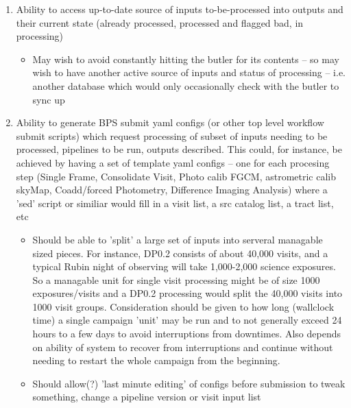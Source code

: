\documentclass[DM,authoryear,toc]{lsstdoc}
\begin{document}
	\begin{enumerate}

	\item Ability to access up-to-date source of inputs to-be-processed
		into outputs and their current state 
		(already processed, processed and flagged bad, 
		in processing)

	\begin{itemize}
	
	\item May wish to avoid constantly hitting the butler for
	its contents -- so may wish to have another active source
	of inputs and status of processing -- i.e. another database
	which would only occasionally check with the butler to sync up


	\end{itemize}

	\item Ability to generate BPS submit yaml configs 
	(or other top level workflow submit scripts) which request processing
	of subset of inputs needing to be processed, pipelines to be run,
	outputs described.  This could, for instance, be achieved by having
	a set of template yaml configs -- one for each procesing step
	(Single Frame, Consolidate Visit, Photo calib FGCM, 
	astrometric calib skyMap, Coadd/forced Photometry, Difference
	Imaging Analysis) where a 'sed' script or similiar would fill in
	a visit list, a src catalog list, a tract list, etc

	\begin{itemize}

	\item Should be able to 'split' a large set of inputs into
	serveral managable sized pieces.  For instance, DP0.2 consists of
	about 40,000 visits, and a typical Rubin night of observing will
	take 1,000-2,000 science exposures.   So a managable unit for
	single visit processing might be of size 1000 exposures/visits and
	a DP0.2 processing would split the 40,000 visits into 1000 visit
	groups.  Consideration should be given to how long (wallclock time)
	a single campaign 'unit' may be run and to not generally exceed 
	24 hours to a few days to avoid interruptions from downtimes.
	Also depends on ability of system to recover from interruptions and
	continue without needing to restart the whole campaign from
	the beginning.
	

	\item  Should allow(?) 'last minute editing' of configs before
	submission to tweak something, change a pipeline version or
	visit input list


\end{itemize}
\end{enumerate}
\end{document}
